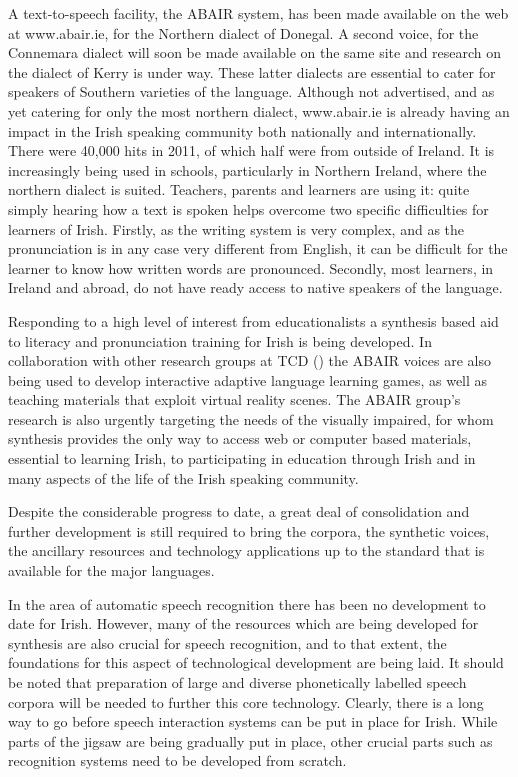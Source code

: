 \begin{multicols}{2}
A text-to-speech facility, the ABAIR system, has been made available on the web at www.abair.ie, for the Northern dialect of Donegal. A second voice, for the Connemara dialect will soon be made available on the same site and research on the dialect of Kerry is under way. These latter dialects are essential to cater for speakers of Southern varieties of the language.  
Although not advertised, and as yet catering for only the most northern dialect, www.abair.ie is already having an impact in the Irish speaking community both nationally and internationally. There were 40,000 hits in 2011, of which half were from outside of Ireland. It is increasingly being used in schools, particularly in Northern Ireland, where the northern dialect is suited. Teachers, parents and learners are using it: quite simply hearing how a text is spoken helps overcome two specific difficulties for learners of Irish. Firstly, as the writing system is very complex, and as the pronunciation is in any case very different from English, it can be difficult for the learner to know how written words are pronounced. Secondly, most learners, in Ireland and abroad, do not have ready access to native speakers of the language. 

Responding to a high level of interest from educationalists a synthesis based aid to literacy and pronunciation training for Irish is being developed. In collaboration with other research groups at TCD (\cite{slate2011}) the ABAIR voices are also being used to develop interactive adaptive language learning games, as well as teaching materials that exploit virtual reality scenes. The ABAIR group’s research is also urgently targeting the needs of the visually impaired, for whom synthesis provides the only way to access web or computer based materials, essential to learning Irish, to participating in education through Irish and in many aspects of the life of the Irish speaking community.

Despite the considerable progress to date, a great deal of consolidation and further development is still required to bring the corpora, the synthetic voices, the ancillary resources and technology applications up to the standard that is available for the major languages.

In the area of automatic speech recognition there has been no development to date for Irish. However, many of the resources which are being developed for synthesis are also crucial for speech recognition, and to that extent, the foundations for this aspect of technological development are being laid. It should be noted that preparation of large and diverse phonetically labelled speech corpora will be needed to further this core technology. Clearly, there is a long way to go before speech interaction systems can be put in place for Irish. While parts of the jigsaw are being gradually put in place, other crucial parts such as recognition systems need to be developed from scratch.


\end{multicols}
